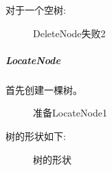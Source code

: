 \documentclass[supercite]{Experimental_Report}
\theoremstyle{definition}
\begin{document}
\noindent
对于一个空树:
\begin{figure}[H]
	\centering
	\centering
	\caption{DeleteNode失败2}
	\label{fig5-42}
\end{figure}

\clearpage
\subparagraph{LocateNode}
\noindent
首先创建一棵树。
\begin{figure}[htbp]
	\centering
	\centering
	\caption{准备LocateNode1}
	\label{fig5-43}
\end{figure}

\noindent
树的形状如下:
\begin{figure}[H]
	\centering
	\centering
	\caption{树的形状}
	\label{fig5-44}
\end{figure}
\end{document}
